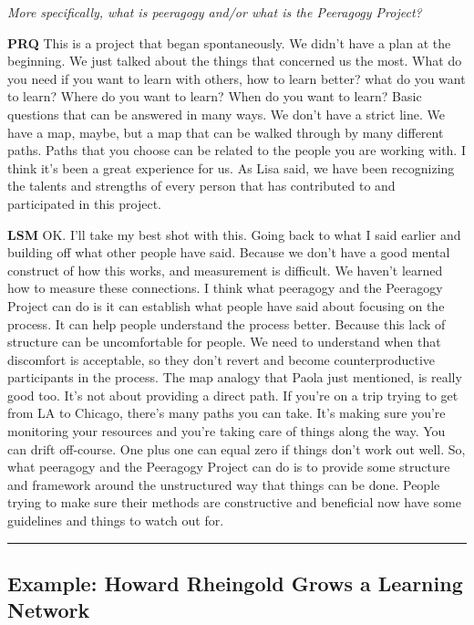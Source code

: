 \emph{More specifically, what is peeragogy and/or what is the Peeragogy
Project?}

\textbf{PRQ} This is a project that began spontaneously. We didn't have
a plan at the beginning. We just talked about the things that concerned
us the most. What do you need if you want to learn with others, how to
learn better? what do you want to learn? Where do you want to learn?
When do you want to learn? Basic questions that can be answered in many
ways. We don't have a strict line. We have a map, maybe, but a map that
can be walked through by many different paths. Paths that you choose can
be related to the people you are working with. I think it's been a great
experience for us. As Lisa said, we have been recognizing the talents
and strengths of every person that has contributed to and participated
in this project.

\textbf{LSM} OK. I'll take my best shot with this. Going back to what I
said earlier and building off what other people have said. Because we
don't have a good mental construct of how this works, and measurement is
difficult. We haven't learned how to measure these connections. I think
what peeragogy and the Peeragogy Project can do is it can establish what
people have said about focusing on the process. It can help people
understand the process better. Because this lack of structure can be
uncomfortable for people. We need to understand when that discomfort is
acceptable, so they don't revert and become counter­productive
participants in the process. The map analogy that Paola just mentioned,
is really good too. It's not about providing a direct path. If you're on
a trip trying to get from LA to Chicago, there's many paths you can
take. It's making sure you're monitoring your resources and you're
taking care of things along the way. You can drift off-course. One plus
one can equal zero if things don't work out well. So, what peeragogy and
the Peeragogy Project can do is to provide some structure and framework
around the unstructured way that things can be done. People trying to
make sure their methods are constructive and beneficial now have some
guidelines and things to watch out for.

\begin{center}\rule{0.5\linewidth}{0.5pt}\end{center}

\hypertarget{example-howard-rheingold-grows-a-learning-network}{%
\subsection{Example: Howard Rheingold Grows a Learning
Network}\label{example-howard-rheingold-grows-a-learning-network}}

